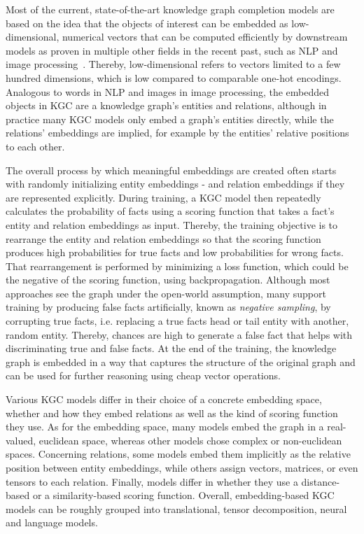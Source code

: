 Most of the current, state-of-the-art knowledge graph completion models are based on the idea that the objects of interest can be embedded as low-dimensional, numerical vectors that can be computed efficiently by downstream models as proven in multiple other fields in the recent past, such as NLP and image processing~\cite{Wang2017KnowledgeGE}. Thereby, low-dimensional refers to vectors limited to a few hundred dimensions, which is low compared to comparable one-hot encodings. Analogous to words in NLP and images in image processing, the embedded objects in KGC are a knowledge graph's entities and relations, although in practice many KGC models only embed a graph's entities directly, while the relations' embeddings are implied, for example by the entities' relative positions to each other.

The overall process by which meaningful embeddings are created often starts with randomly initializing entity embeddings - and relation embeddings if they are represented explicitly. During training, a KGC model then repeatedly calculates the probability of facts using a scoring function that takes a fact's entity and relation embeddings as input. Thereby, the training objective is to rearrange the entity and relation embeddings so that the scoring function produces high probabilities for true facts and low probabilities for wrong facts. That rearrangement is performed by minimizing a loss function, which could be the negative of the scoring function, using backpropagation. Although most approaches see the graph under the open-world assumption, many support training by producing false facts artificially, known as \emph{negative sampling}, by corrupting true facts, i.e. replacing a true facts head or tail entity with another, random entity. Thereby, chances are high to generate a false fact that helps with discriminating true and false facts. At the end of the training, the knowledge graph is embedded in a way that captures the structure of the original graph and can be used for further reasoning using cheap vector operations.

Various KGC models differ in their choice of a concrete embedding space, whether and how they embed relations as well as the kind of scoring function they use. As for the embedding space, many models embed the graph in a real-valued, euclidean space, whereas other models chose complex or non-euclidean spaces. Concerning relations, some models embed them implicitly as the relative position between entity embeddings, while others assign vectors, matrices, or even tensors to each relation. Finally, models differ in whether they use a distance-based or a similarity-based scoring function. Overall, embedding-based KGC models can be roughly grouped into translational, tensor decomposition, neural and language models.

